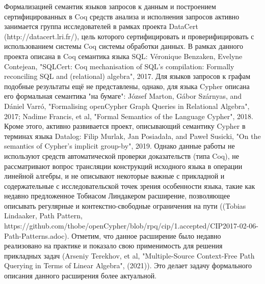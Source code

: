 \documentclass[12pt]{article}  %
\theoremstyle{remark}
\begin{document}
Формализацией семантик языков запросов к данным и построением сертифицированных в Coq средств анализа и исполнения запросов активно занимается группа исследователей в рамках проекта DataCert (http://datacert.lri.fr/), цель которого сертифицировать и проверифицировать с использованием системы Coq системы обработки данных. В рамках данного проекта описана в Coq семантика языка SQL: Véronique Benzaken, Evelyne Contejean, "SQLCert: Coq mechanisation of SQL’s compilation: Formally reconciling SQL and (relational) algebra", 2017. Для языков запросов к графам подобные результаты ещё не представлены, однако, для языка Cypher описана его формальная семантика "на бумаге": J\'{o}zsef Marton, Gábor Szárnyas, and Dániel Varró, "Formalising openCypher Graph Queries in Relational Algebra", 2017; Nadime Francis, et al, "Formal Semantics of the Language Cypher", 2018. Кроме этого, активно развивается проект, описывающий семантику Cypher в терминах языка Datalog: Filip Murlak, Jan Posiadała, and Paweł Susicki, "On the semantics of Cypher's implicit group-by", 2019. Однако данные работы не используют средств автоматической проверки доказательств (типа Coq), не рассматривают вопрос трансляции конструкций исходного языка в операции линейной алгебры, и не описывают некоторые важные с прикладной и содержательные с исследовательской точек зрения особенности языка, такие как недавно предложенное Тобиасом Линдакером расширение, позволяющее описывать регулярные и контекстно-свободные ограничения на пути ((Tobias Lindaaker, Path Pattern, https://github.com/thobe/openCypher/blob/rpq/cip/1.accepted/CIP2017-02-06-Path-Patterns.adoc). Отметим, что данное расширение было недавно реализовано на практике и показало свою применимость для решения прикладных задач (Arseniy Terekhov, et al, "Multiple-Source Context-Free Path Querying in Terms of Linear Algebra", (2021)). Это делает задачу формального описания данного расширения более актуальной.
\end{document}
